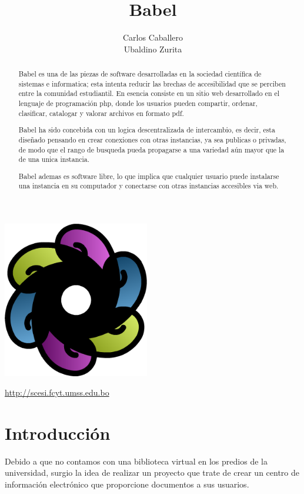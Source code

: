 \documentclass[letter,12pt]{article}
\title{\bf Babel}
\author{Carlos Caballero\\Ubaldino Zurita}
\begin{document}
\maketitle
\begin{center}\includegraphics[width=0.48\textwidth]{img/babel.png}\end{center}
\begin{center}\url {http://scesi.fcyt.umss.edu.bo}\end{center}
\pagebreak

\tableofcontents
\pagebreak

\begin{abstract}
Babel es una de las piezas de software desarrolladas en la sociedad científica de sistemas e
informatica; esta intenta reducir las brechas de accesibilidad que se perciben entre la comunidad
estudiantil. En esencia consiste en un sitio web desarrollado en el lenguaje de programación php,
donde los usuarios pueden compartir, ordenar, clasificar, catalogar y valorar archivos en formato
pdf.

Babel ha sido concebida con un logica descentralizada de intercambio, es decir, esta diseñado
pensando en crear conexiones con otras instancias, ya sea publicas o privadas, de modo que el
rango de busqueda pueda propagarse a una variedad aún mayor que la de una unica instancia.

Babel ademas es software libre, lo que implica que cualquier usuario puede instalarse una 
instancia en su computador y conectarse con otras instancias accesibles via web.
\end{abstract}
\pagebreak

\section{Introducción}
Debido a que no contamos con una biblioteca virtual en los predios de la universidad, surgio la
idea de realizar un proyecto que trate de crear un centro de información electrónico que
proporcione documentos a sus usuarios.
\end{document}
